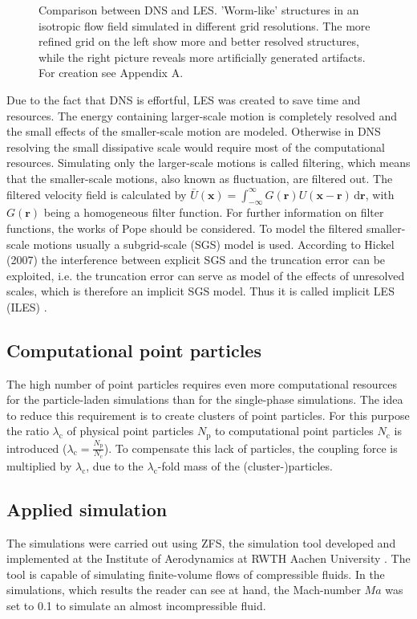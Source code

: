 \documentclass[11pt,a4paper,openany,oneside,parskip=half*]{article}
\renewcommand*\vec[1]{\boldsymbol{#1}}
\begin{document}
\begin{figure}[h]
\begin{minipage}[t]{0.5\textwidth}
        \label{64_velocity}
    \end{minipage}
    \captionsetup{width=0.97\linewidth}
\caption{Comparison between DNS and LES. 'Worm-like' structures in an isotropic flow field simulated in different grid resolutions. The more refined grid on the left show more and better resolved structures, while the right picture reveals more artificially generated artifacts. For creation see Appendix A.}
\end{figure}
Due to the fact that DNS is effortful, LES was created to save time and resources. The energy containing larger-scale motion is completely resolved and the small effects of the smaller-scale motion are modeled. Otherwise in DNS resolving the small dissipative scale would require most of the computational resources.
\newline
Simulating only the larger-scale motions is called filtering, which means that the smaller-scale motions, also known as fluctuation, are filtered out. The filtered velocity field is calculated by $\bar U(\vec{x}) = \int_{-\infty}^{\infty} G(\vec{r})U(\vec{x} - \vec{r})  \, \mathrm{d}\vec{r}$, with $G(\vec{r}) $ being a homogeneous filter function. For further information on filter functions, the works of Pope \cite{turbulentFlows} should be considered. To model the filtered smaller-scale motions usually a subgrid-scale (SGS) model is used. According to Hickel (2007) the interference between explicit SGS and the truncation error can be exploited, i.e. the truncation error can serve as model of the effects of unresolved scales, which is therefore an implicit SGS model. Thus it is called implicit LES (ILES) \cite{implicitLES}. 
\subsection{Computational point particles}
The high number of point particles requires even more computational resources for the particle-laden simulations than for the single-phase simulations. The idea to reduce this requirement is to create clusters of point particles. For this purpose the ratio $\lambda_\mathrm{c}$ of physical point particles $N_\mathrm{p}$ to computational point particles $N_\mathrm{c}$ is introduced ($\lambda_\mathrm{c} = \frac{N_\mathrm{p}}{N_\mathrm{c}}$). To compensate this lack of particles, the coupling force is multiplied by $\lambda_\mathrm{c}$, due to the $\lambda_\mathrm{c}$-fold mass of the (cluster-)particles.
\newline
\subsection{Applied simulation}
The simulations were carried out using ZFS, the simulation tool developed and implemented at the Institute of Aerodynamics at RWTH Aachen University 
\cite{anAdaptiveMultilevelMultigridFormulationForCartesianHierarchicalGridMethods} \cite{aStrictlyConservativeCartesianCutCellMethodForCompressibleViscousFlowsOnAdaptiveGrids}. 
The tool is capable of simulating finite-volume flows of compressible fluids. In the simulations, which results the reader can see at hand, the Mach-number $Ma$ was set to 0.1 to simulate an almost incompressible fluid.
\pagebreak
\end{document}
